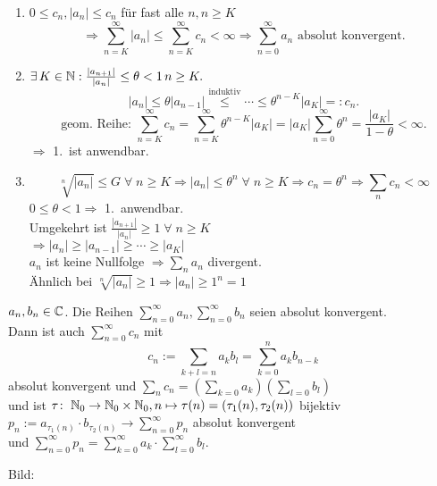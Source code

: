 \documentclass[../ana1.tex]{subfiles}
\begin{document}
\begin{bew}\leavevmode
    \begin{enumerate}
        \item \( 0 \leq c_n, |a_n| \leq c_n \) für fast alle \( n, n\geq K\)
        \[ \Rightarrow \sum_{n=K}^{\infty} |a_n| \leq \sum_{n=K}^\infty c_n < \infty \Rightarrow \sum_{n=0}^\infty a_n \text{ absolut konvergent.} \]
        \item \( \exists \, K\in\mathbb{N}: \frac{|a_{n+1}|}{|a_n|} \leq \theta < 1 \, n\geq K. \)
        \[ |a_n| \leq \theta |a_{n-1}| \overset{\text{induktiv}}{\leq} \cdots \leq \theta^{n-K}|a_K| =: c_n. \]
        \[ \text{geom. Reihe: } \sum_{n=K}^\infty c_n = \sum_{n=K}^\infty \theta^{n-K}|a_K| = |a_K| \sum_{n=0}^\infty \theta^n = \frac{|a_K|}{1-\theta} < \infty. \]
        \( \Rightarrow \) 1.\ ist anwendbar. 
        \item \[ \sqrt[n]{|a_n|} \leq G \;\forall \; n\geq K \Rightarrow |a_n| \leq \theta^n \;\forall \; n\geq K \Rightarrow c_n = \theta^n \Rightarrow \sum_n c_n < \infty \]
        \( 0 \leq \theta < 1 \Rightarrow \) 1.\ anwendbar.\\
        Umgekehrt ist \( \frac{|a_{n+1}|}{|a_n|} \geq 1 \;\forall \; n\geq K \) \\
        \( \Rightarrow |a_n| \geq |a_{n-1}| \geq \cdots \geq |a_K| \) \\
        \( a_n \) ist keine Nullfolge \( \Rightarrow \sum_n a_n \) divergent.\\
        Ähnlich bei \( \sqrt[n]{|a_n|} \geq 1 \Rightarrow |a_n| \geq 1^n = 1 \)
    \end{enumerate}
\end{bew}
\begin{satz}[Cauchyprodukt]
    \( a_n, b_n \in\mathbb{C} \). Die Reihen \( \sum_{n=0}^\infty a_n, \sum_{n=0}^\infty b_n \) seien absolut konvergent.\\
    Dann ist auch \( \sum_{n=0}^\infty c_n \) mit 
    \[ c_n := \sum_{k+l=n} a_k b_l = \sum_{k=0}^n a_k b_{n-k} \]
    absolut konvergent und \( \sum_n c_n = ( \sum_{k=0} a_k )( \sum_{l=0} b_l ) \) \\
    und ist \(\tau \colon \; \mathbb{N}_0 \rightarrow \mathbb{N}_0 \times \mathbb{N}_0, n \mapsto \tau(n) = (\tau_1(n), \tau_2(n)) \) bijektiv
    \( p_n := a_{\tau_1(n)} \cdot b_{\tau_2(n)} \rightarrow \sum_{n=0}^\infty p_n \) absolut konvergent \\
    und \( \sum_{n=0}^\infty p_n = \sum_{k=0}^\infty a_k \cdot \sum_{l=0}^\infty b_l \).
\end{satz}
Bild:\\
\end{document}
